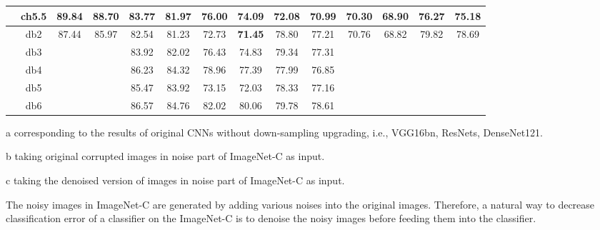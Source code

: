 \begin{table}[!t]
\begin{center}
\begin{threeparttable}
{\begin{tabular}{cc||cc||cc||cc||cc||cc||cc}
&\multicolumn{1}{|c||}{ch5.5}                 &               89.84&     88.70&     83.77&    81.97&     76.00&    74.09&      72.08&    \textbf{70.99}&     70.30&    68.90&     76.27&  75.18\\\hline
{\multirow{5}{*}{Daubechies}}&\multicolumn{1}{|c||}{db2} &    87.44&     85.97&     82.54&    81.23&     72.73&    \textbf{71.45}&      78.80&    77.21&     70.76&    68.82&     79.82&  78.69\\
&\multicolumn{1}{|c||}{db3}	                  &                    &          &     83.92&    82.02&     76.43&    74.83&      79.34&    77.31&          &         &          &       \\
&\multicolumn{1}{|c||}{db4}	                  &                    &          &     86.23&    84.32&     78.96&    77.39&      77.99&    76.85&          &         &          &       \\
&\multicolumn{1}{|c||}{db5}	                  &                    &          &     85.47&    83.92&     73.15&    72.03&      78.33&    77.16&          &         &          &       \\
&\multicolumn{1}{|c||}{db6}	                  &                    &          &     86.57&    84.76&     82.02&    80.06&      79.78&    78.61&          &         &          &       \\\hline
			\end{tabular}}
		\begin{tablenotes}
			\item[a] corresponding to the results of original CNNs without down-sampling upgrading, i.e., VGG16bn, ResNets, DenseNet121.
			\item[b] taking original corrupted images in noise part of ImageNet-C as input.
			\item[c] taking the denoised version of images in noise part of ImageNet-C as input.
		\end{tablenotes}
	\end{threeparttable}
	\end{center}
\end{table}

The noisy images in ImageNet-C are generated by adding various noises into the original images.
Therefore, a natural way to decrease classification error of a classifier on the ImageNet-C
is to denoise the noisy images before feeding them into the classifier.


